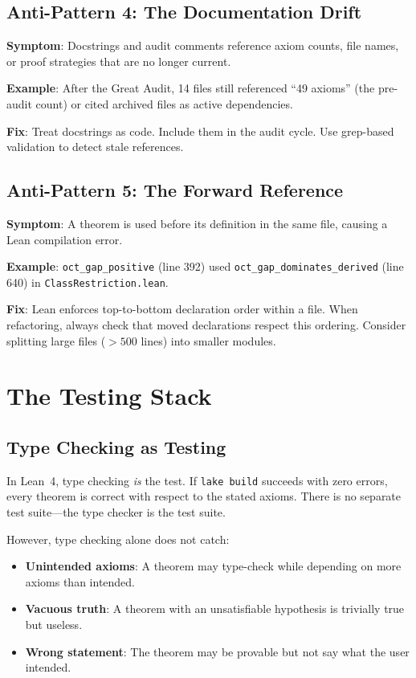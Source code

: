 \documentclass[11pt,a4paper]{article}
\theoremstyle{definition}
\newcommand{\lean}[1]{\texttt{#1}}
\begin{document}
\subsection{Anti-Pattern 4: The Documentation Drift}

\textbf{Symptom}: Docstrings and audit comments reference axiom counts,
file names, or proof strategies that are no longer current.

\textbf{Example}: After the Great Audit, 14 files still referenced
``49 axioms'' (the pre-audit count) or cited archived files as active
dependencies.

\textbf{Fix}: Treat docstrings as code. Include them in the audit cycle.
Use grep-based validation to detect stale references.

\subsection{Anti-Pattern 5: The Forward Reference}

\textbf{Symptom}: A theorem is used before its definition in the same
file, causing a Lean compilation error.

\textbf{Example}: \lean{oct\_gap\_positive} (line 392) used
\lean{oct\_gap\_dominates\_derived} (line 640) in
\lean{ClassRestriction.lean}.

\textbf{Fix}: Lean enforces top-to-bottom declaration order within
a file. When refactoring, always check that moved declarations
respect this ordering. Consider splitting large files ($>500$ lines)
into smaller modules.

\section{The Testing Stack}
\label{sec:testing}

\subsection{Type Checking as Testing}

In Lean~4, type checking \emph{is} the test. If \texttt{lake build}
succeeds with zero errors, every theorem is correct with respect to
the stated axioms. There is no separate test suite---the type checker
is the test suite.

However, type checking alone does not catch:
\begin{itemize}
  \item \textbf{Unintended axioms}: A theorem may type-check while
    depending on more axioms than intended.
  \item \textbf{Vacuous truth}: A theorem with an unsatisfiable
    hypothesis is trivially true but useless.
  \item \textbf{Wrong statement}: The theorem may be provable but
    not say what the user intended.
\end{itemize}
\end{document}
